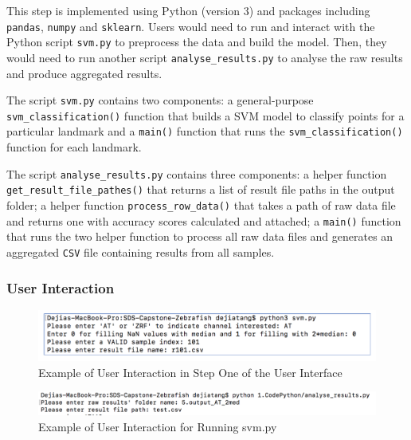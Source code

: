 \documentclass[10pt,letterpaper]{article}
\begin{document}
This step is implemented using Python (version 3) and packages including
\texttt{pandas}, \texttt{numpy} and \texttt{sklearn}. Users would need
to run and interact with the Python script \texttt{svm.py} to preprocess
the data and build the model. Then, they would need to run another
script \texttt{analyse\_results.py} to analyse the raw results and
produce aggregated results.

The script \texttt{svm.py} contains two components: a general-purpose
\texttt{svm\_classification()} function that builds a SVM model to
classify points for a particular landmark and a \texttt{main()} function
that runs the \texttt{svm\_classification()} function for each landmark.

The script \texttt{analyse\_results.py} contains three components: a
helper function \texttt{get\_result\_file\_pathes()} that returns a list
of result file paths in the output folder; a helper function
\texttt{process\_row\_data()} that takes a path of raw data file and
returns one with accuracy scores calculated and attached; a
\texttt{main()} function that runs the two helper function to process
all raw data files and generates an aggregated \texttt{CSV} file
containing results from all samples.

\subsubsection{User Interaction}\label{user-interaction}

\begin{figure}[h]

{\centering \includegraphics[width=4.49in]{figures/Figure2} 

}

\caption{\label{fig:useri} Example of User Interaction in Step One of the User Interface}\label{fig:unnamed-chunk-5}
\end{figure}

\begin{figure}[h]
\includegraphics[width=5.03in]{figures/Figure4} \caption{\label{fig:useri2} Example of User Interaction for Running svm.py}\label{fig:unnamed-chunk-6}
\end{figure}
\end{document}

